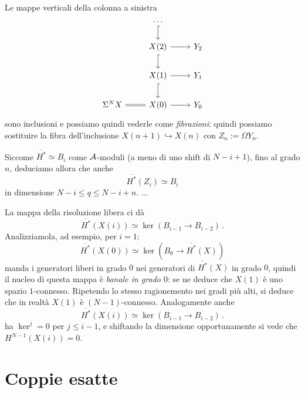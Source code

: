 
Le mappe verticali della colonna a sinistra
\begin{equation*}
	\begin{tikzcd}
		& \dots \ar[d, hook] & \\
		& X(2) \ar[d, hook] \ar[r] & Y_{2} \\
		& X(1) \ar[d, hook] \ar[r] & Y_{1} \\
		\Sigma^{N} X \ar[r, equals] & X(0) \ar[r] & Y_{0} 
	\end{tikzcd}
\end{equation*}
sono inclusioni e possiamo quindi vederle come \emph{fibrazioni}:
quindi possiamo sostituire la fibra dell'inclusione $X(n+1) \hookrightarrow X(n)$
con $Z_{n} := \Omega Y_{n}$.

Siccome $\overline{H^{*}} \simeq B_{i}$ come $\mathcal{A}$-moduli (a meno di uno shift di $N-i+1$),
fino al grado $n$, deduciamo allora che anche
\begin{equation*}
	\overline{H^{*}}(Z_{i}) \simeq B_{i}
\end{equation*}
in dimensione $N-i \le q \le N-i+n$.
...

\begin{oss}
	La mappa della risoluzione libera ci dà
	\begin{equation*}
		\overline{H^{*}}(X(i)) \simeq \ker \left( B_{i-1} \longrightarrow B_{i-2} \right)\,.
	\end{equation*}
	Analizziamola, ad esempio, per $i=1$:
	\begin{equation*}
		\overline{H^{*}}(X(0)) \simeq \ker \left( B_{0} \longrightarrow \overline{H^{*}}(X) \right)
	\end{equation*}
	manda i generatori liberi in grado $0$ nei generatori di $\overline{H^{*}}(X)$ in grado $0$,
	quindi il nucleo di questa mappa è \emph{banale in grado $0$}:
	se ne deduce che $X(1)$ è uno spazio $1$-connesso.
	Ripetendo lo stesso ragionemento nei gradi più alti,
	si deduce che in realtà $X(1)$ è $(N-1)$-connesso.
	Analogamente anche
	\begin{equation*}
		\overline{H^{*}}(X(i)) \simeq \ker \left( B_{i-1} \longrightarrow B_{i-2} \right)\,.
	\end{equation*}
	ha $\ker^{j} = 0$ per $j \le i-1$, e shiftando la dimensione opportunamente
	si vede che $H^{N-1}(X(i))=0$.
\end{oss}

\section{Coppie esatte}

